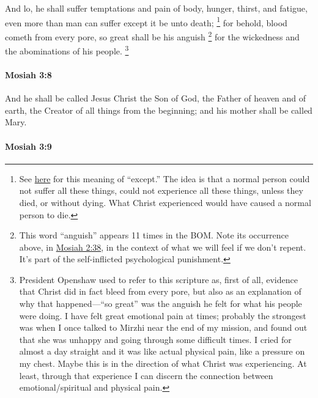 			And lo, he shall suffer temptations
			and pain of body, hunger, thirst, and fatigue,
			even more than man can suffer except it be unto death;%
			\footnote{%
				\label{MOSIAH-3-7-NOTE-except}%
				See \hyperref[EXCEPT-1828-participle]{here} for this meaning of ``except.'' The idea is that a normal person could not suffer all these things, could not experience all these things, unless they died, or without dying. What Christ experienced would have caused a normal person to die.
				} 
			for behold, blood cometh from every pore,
			so great shall be his anguish%
				\footnote{%
					\label{MOSIAH-3-7-NOTE-anguish}%
					This word ``anguish'' appears 11 times in the BOM. Note its occurrence above, in \hyperref[MOSIAH-2-38]{Mosiah 2:38}, in the context of what we will feel if we don't repent. It's part of the self-inflicted psychological punishment.
					}
			for the wickedness
			and the abominations of his people.%
				\footnote{%
					President Openshaw used to refer to this scripture as, first of all, evidence that Christ did in fact bleed from every pore, but also as an explanation of why that happened---``so great'' was the anguish he felt for what his people were doing. I have felt great emotional pain at times; probably the strongest was when I once talked to Mirzhi near the end of my mission, and found out that she was unhappy and going through some difficult times. I cried for almost a day straight and it was like actual physical pain, like a pressure on my chest. Maybe this is in the direction of what Christ was experiencing. At least, through that experience I can discern the connection between emotional/spiritual and physical pain.
					}

		\paragraph{Mosiah 3:8} %
			\label{MOSIAH-3-8}

			And he shall be called Jesus Christ the Son of God,
			the Father of heaven and of earth,
			the Creator of all things from the beginning;
			and his mother shall be called Mary.

		\paragraph{Mosiah 3:9} %
			\label{MOSIAH-3-9}

